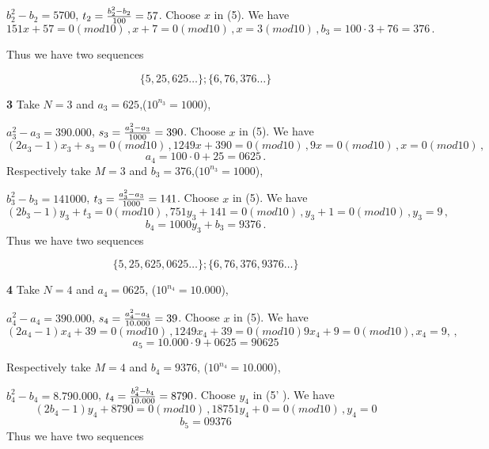  $b_2^2-b_2=5700$, $t_2={b_2^2-b_2\over 100}=57$. Choose $x$ in (5).  We have
                                   $$
151x+57=0(mod10)\,,x+7=0  (mod 10)\,,x=3 (mod10) 
                           \,,b_3= 100\cdot 3+76=376\,.         
                                   $$


Thus we have two sequences



                               $$
                               \{5,25,625\dots\};
                               \{6,76,376\dots\}
                                $$

\medskip

{\bf 3}  Take $N=3$ and $a_3=625$,($10^{n_3}=1000$),

 $a_3^2-a_3=390.000$, $s_3={a_3^2-a_3\over 1000}=390$. 
 Choose $x$ in (5).  We have
                                   $$
 (2a_3-1)x_3+s_3=0(mod 10)\,, 1249x+390=0(mod10)\,,
 9x=0  (mod 10)\,,x=0 (mod10) \,,
                               $$
                          $$     
a_4=100\cdot 0+25=0625\,.         
                                   $$
Respectively take $M=3$ and $b_3=376$,($10^{n_3}=1000$),

 $b_3^2-b_3=141000$, $t_3={a_3^2-a_3\over 1000}=141$. 
 Choose $x$ in (5).  We have
                              $$
 (2b_3-1)y_3+t_3=0(mod10)\,, 751y_3+141=0(mod 10)\,,y_3+1=0(mod 10)\,,
 y_3=9\,,
                 $$
                 $$
                 b_4= 1000y_3+b_3=9376\,.
                                   $$
Thus we have two sequences



                               $$
                               \{5,25,625, 0625\dots\};
                               \{6,76,376, 9376\dots\}
                                $$

\medskip

 {\bf  4} 
 Take $N=4$ and $a_4=0625$, ($10^{n_4}=10.000$),

 $a_4^2-a_4=390.000$, $s_4={a_4^2-a_4\over 10.000}=39$. 
 Choose $x$ in (5).  We have
                                   $$
                (2a_4-1)x_4+39=0(mod10)\,,
                   1249x_4+39=0(mod 10)
                9x_4+9=0(mod10),x_4=9,\,,
                $$
                $$
a_5=10.000\cdot 9+0625=90625
           $$
 

Respectively  take $M=4$ and         $b_4=9376$, ($10^{n_4}=10.000$),

 $b_4^2-b_4=8.790.000$, $t_4={b_4^2-b_4\over 10.000}=8790$. 
 Choose $y_4$ in (5' ).  We have
                                   $$
                (2b_4-1)y_4+8790=0(mod10)\,,
                18751y_4+0=0 (mod10)\,, y_4=0
                $$
                $$
                b_5=09376
                $$
Thus we have two sequences



